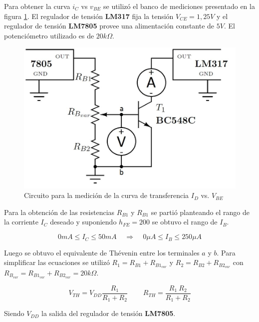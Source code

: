 \documentclass[10pt,spanish,a4paper,openany,notitlepage]{article}
\begin{document}
Para obtener la curva $i_C$ vs $v_{BE}$ se utilizó el banco de mediciones presentado en la figura \ref{circuito:medicion_transferencia}. El regulador de tensión \textbf{LM317} fija la tensión $V_{CE}=1,25\unit{V}$ y el regulador de tensión \textbf{LM7805} provee una alimentación constante de $5\unit{V}$. El potenciómetro utilizado es de $20 \unit{k\Omega}$.

\begin{figure}[H] %
\begin{center}
\includegraphics[scale=0.3]{./imagenes/ic_vbe.jpg}
\caption{Circuito para la medición de la curva de transferencia $I_D$ vs. $V_{BE}$}
 \label{circuito:medicion_transferencia}
\end{center}
\end{figure}

Para la obtención de las resistencias $R_{B1}$ y $R_{B1}$ se partió planteando el rango de la corriente $I_C$ deseado y suponiendo $h_{FE} = 200$ se obtuvo el rango de $I_B$.

\[ \displaystyle 0 \unit{mA} \leq I_C \leq 50\unit{mA} \ \ \ \ \ \Longrightarrow \ \ \ \ \  0 \unit{\mu A} \leq I_B \leq 250 \unit{\mu A} \]

Luego se obtuvo el equivalente de Thévenin entre los terminales $a$ y $b$. Para simplificar las ecuaciones se utilizó $R_1 = R_{B1} + R_{B1_{var}}$ y $R_2 = R_{B2} + R_{B2_{var}}$ con $R_{B_{var}} = R_{B1_{var}} + R_{B2_{var}} = 20 \unit{k\Omega}$.

\[ \displaystyle V_{TH} = V_{DD} \frac{R_1}{R_1 + R_2}\ \ \ \ \ \ \ \ \ \ R_{TH} = \frac{R_1\ R_2}{R_1 + R_2}\]

Siendo $V_{DD}$ la salida del regulador de tensión \textbf{LM7805}. 
\end{document}
